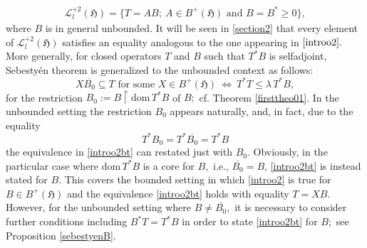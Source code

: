 \documentclass{amsart}
\newcommand{\ifaf}{\Leftrightarrow}
\newcommand{\h}{\mathfrak{H}}
\newcommand{\D}{\mathrm{dom}\,}
\newcommand{\adj}{^*}
\newcommand{\tstar}{T^{*}}
\newcommand{\inclu}{\subseteq}
\newcommand{\lplus}{B^{+}(\h)}
\newcommand{\ldeux}{\mathcal{L}_l^{+2}(\h)}
\newcommand{\rest}{\upharpoonright}
\numberwithin{equation}{section}
\begin{document}
\begin{eqnarray*}
     \ldeux=  \Big\{T=AB; \ A \in \lplus \text{ and } B = B\adj \geq 0   \Big\}, 
\end{eqnarray*}
where $B$ is in general unbounded. It will be seen in \cref{section2}
            that every element of   $\ldeux$ satisfies an equality analogous to the one appearing in    $\eqref{introo2}.$ More generally,  for closed operators  $T$ and $B$ such that $\tstar B$ is selfadjoint,    Sebestyén theorem \cite{sebestyen1983restrictions} is generalized to the unbounded context as follows:
                 \begin{equation} \label{introo2bt}
                 X \overline{B_0} \inclu T \text{ for some } X \in \lplus \  \ifaf \  T^*T \leq \lambda\, T^*B,
                \end{equation}
               for the restriction  $B_0:=B \rest \D \tstar B$ of $B;$ cf. Theorem \ref{firsttheo01}. In the unbounded setting the restriction $B_0$ appears naturally, and, in fact, due to the equality
               $$
               \tstar B_0 = \tstar \overline{B_0}= \tstar B
               $$
               the equivalence in \eqref{introo2bt} can restated just with $B_0.$ Obviously, in the particular case where $\D \tstar B$ is a core for $B,$ i.e., $\overline{B_0}= B$, \eqref{introo2bt} is    instead stated for $B.$ This covers the bounded setting in which \eqref{introo2} is true for $B \in \lplus$ and the equivalence  \eqref{introo2bt} holds with equality  $T =XB.$  However, for the unbounded setting where $B \neq \overline{B_0},$ it is necessary to consider further conditions  including
               $B\adj T = \tstar B$  in order to state  \eqref{introo2bt} for $B;$ see Proposition \ref{sebestyenB}.
\end{document}
